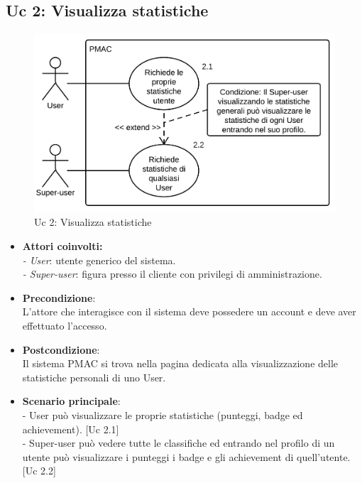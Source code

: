 \documentclass[10pt,a4paper]{article}
\begin{document}
\subsection{Uc 2: Visualizza statistiche}
\begin{figure}[ht]
\centering
\caption{Uc 2: Visualizza statistiche}
\includegraphics[scale=0.87]{UseCase/Uc2} %
\end{figure}

\begin{itemize}

\item \textbf{Attori coinvolti:}\\
\emph{- User}: utente generico del sistema.\\
\emph{- Super-user}: figura presso il cliente con privilegi di amministrazione.

\item \textbf{Precondizione}:\\
L'attore che interagisce con il sistema deve possedere un account e deve aver effettuato l'accesso.

\item \textbf{Postcondizione}:\\
Il sistema PMAC si trova nella pagina dedicata alla visualizzazione delle statistiche personali di uno User.

\item \textbf{Scenario principale}:\\
- User può visualizzare le proprie statistiche (punteggi, badge ed achievement). [Uc 2.1]\\
- Super-user può vedere tutte le classifiche ed entrando nel profilo di un utente può visualizzare i punteggi i badge e gli achievement di quell'utente. [Uc 2.2]
\end{itemize}
\end{document}
